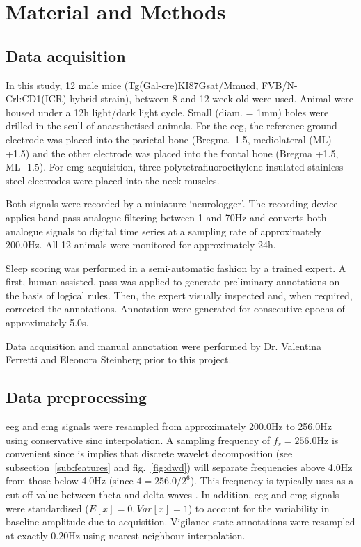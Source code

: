 \section{Material and Methods} \label{matmet}

\subsection{Data acquisition}
In this study, 12 male mice (Tg(Gal-cre)KI87Gsat/Mmucd, FVB/N-Crl:CD1(ICR) hybrid strain),
between 8 and 12 week old were used.
Animal were housed under a 12h light/dark light cycle.
Small (diam. = 1mm) holes were drilled in the scull of anaesthetised animals.
For the  \gls{eeg}, the reference-ground electrode was placed into the parietal bone (Bregma -1.5, mediolateral (ML) +1.5) and
 the other electrode was placed into the frontal bone (Bregma +1.5, ML -1.5).
For \gls{emg} acquisition, three polytetrafluoroethylene-insulated stainless steel electrodes were placed into the neck muscles.

Both signals were recorded by a miniature
`neurologger'\cite{vyssotski_miniature_2006}.
The recording device applies band-pass analogue filtering between 1 and 70Hz and converts both analogue signals to digital time series at a sampling rate of approximately 200.0Hz.
All 12 animals were monitored for approximately 24h.

Sleep scoring was performed in a semi-automatic fashion by a trained
expert.
A first, human assisted, pass was applied to generate preliminary annotations on the basis of logical rules\cite{costa-miserachs_automated_2003}.
Then, the expert visually inspected and, when required, corrected the annotations.
Annotation were generated for consecutive epochs of approximately 5.0s.

Data acquisition and manual annotation were performed by Dr. Valentina
Ferretti and Eleonora Steinberg prior to this project.
\subsection{Data preprocessing}

\gls{eeg} and \gls{emg} signals were resampled from approximately 200.0Hz to 256.0Hz using
conservative sinc interpolation\cite{putnam_design_1997}.
A sampling frequency of $f_s  = 256.0$Hz is convenient since is implies that discrete wavelet decomposition (see subsection~\ref{sub:features} and fig.~\ref{fig:dwd}) will separate
frequencies above 4.0Hz from those below 4.0Hz (since $4 = 256.0/{2^6} $).
This frequency is typically uses as a cut-off value between theta and delta
waves \cite{vyazovskiy_nrem_2014}.
In addition, \gls{eeg} and \gls{emg} signals were standardised ($E[x] = 0, Var[x] = 1$) to account for the variability in baseline amplitude due to acquisition.
Vigilance state annotations were resampled at exactly 0.20Hz using nearest neighbour interpolation.

